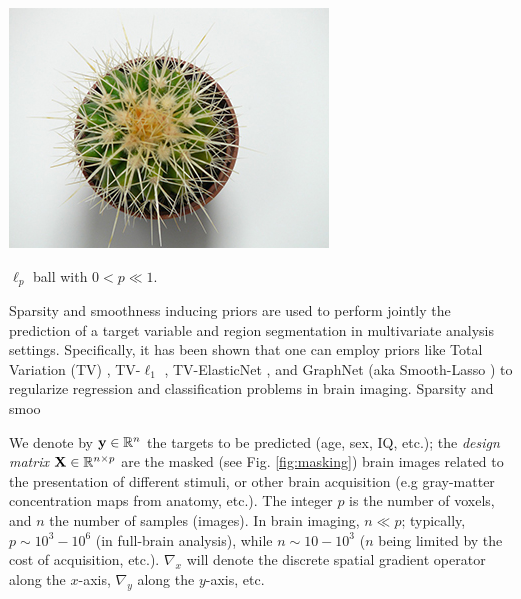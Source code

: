 \begin{marginfigure}[4cm]
  \centering
  \includegraphics[width=1\linewidth]{figures/ball.jpg}
  \caption{$\ell_p$ ball with $0 < p \ll 1$.}
  \label{fig:flower}
\end{marginfigure}

Sparsity and smoothness inducing priors are used to
perform jointly the prediction of a target variable and region
segmentation in multivariate analysis settings.
Specifically, it has been shown that one can employ priors like Total
Variation (TV)  \citep{michel2011tv}, TV-$\ell_1$
 \citep{baldassarre2012,gramfort2013}, TV-ElasticNet
 \citep{dubois2014predictive},
and GraphNet  \citep{grosenick2013}
(aka Smooth-Lasso   \citep{hebiri2011})
to regularize regression and classification
problems in brain imaging. Sparsity and smoo


We denote by ${\mathbf{y}} \in \mathbb{R}^{n}$ the targets to
be predicted (age, sex, IQ, etc.); the \textit{design matrix}
${\mathbf{X}}\in\mathbb{R}^{n \times p}$ are the masked (see Fig. \ref{fig:masking})
brain images related to the presentation of different
stimuli, or other brain acquisition (e.g gray-matter concentration
maps from anatomy, etc.). The integer $p$ is the number of voxels,
and $n$ the number of samples (images). In brain imaging, $n \ll p$;
typically, $p \sim 10^3-10^6$ (in full-brain analysis),
while $n \sim 10-10^3$ ($n$ being limited by the cost of acquisition,
etc.). $\nabla_x$ will denote the discrete spatial gradient operator
along the $x$-axis, $\nabla_y$ along the $y$-axis, etc.

